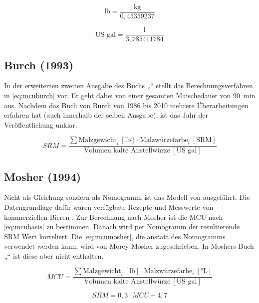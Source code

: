 \documentclass[a4paper,parskip=half]{scrartcl}
\newcommand{\MCUL}{\mathit{MCU}}
\newcommand{\SRM}{\mathit{SRM}}
\newcommand{\ulovi}{\:[\textrm{°L}]}
\newcommand{\usrm}{\:[\textrm{SRM}]}
\newcommand{\ugal}{\:[\textrm{US gal}]}
\newcommand{\ulb}{\:[\textrm{lb}]}
\begin{document}
\begin{equation}
\text{lb} = \frac{\text{kg}}{0,45359237}
\label{eq:kgtolb}
\end{equation}

\begin{equation}
\text{US gal} = \frac{\text{l}}{3,785411784}
\label{eq:ltogal}
\end{equation}

\subsection*{Burch (1993)}

In der erweiterten zweiten Ausgabe des Buchs „“ stellt \textcite[102]{Burch2010} das Berechnungsverfahren in \autoref{eq:mcuburch} vor. Er geht dabei von einer gesamten Maischedauer von 90~min aus. Nachdem das Buch von Burch von 1986 bis 2010 mehrere Überarbeitungen erfahren hat (auch innerhalb der selben Ausgabe), ist das Jahr der Veröffentlichung unklar.

\begin{equation}
\SRM = \frac{\sum \text{Malzgewicht}_i \ulb \cdot \text{Malzwürzefarbe}_i \usrm}{\text{Volumen kalte Anstellwürze} \ugal} 
\label{eq:mcuburch}
\end{equation}

\subsection*{Mosher (1994)}

Nicht als Gleichung sondern als Nomogramm ist das Modell von \textcite[34]{Mosher1994} ausgeführt. Die Datengrundlage dafür waren verfügbate Rezepte und Messwerte von kommerziellen Bieren \parencite{Morey2004}. Zur Berechnung nach Mosher ist die MCU nach \autoref{eq:mcubasis} zu bestimmen. Danach wird per Nomogramm der resultierende SRM Wert korreliert. Die \autoref{eq:mcumosher}, die anstatt des Nomogramms verwendet werden kann, wird von Morey Mosher zugeschrieben. In Moshers Buch „“ ist diese aber nicht enthalten. 

\begin{equation}
\MCUL = \frac{\sum \text{Malzgewicht}_i \ulb \cdot \text{Malzwürzefarbe}_i \ulovi}{\text{Volumen kalte Anstellwürze} \ugal} 
\label{eq:mcubasis}
\end{equation}

\begin{equation}
\SRM = 0,3 \cdot \MCUL + 4,7
\label{eq:mcumosher}
\end{equation}
\end{document}
